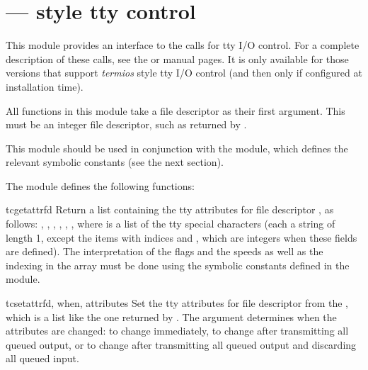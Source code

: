 \section{ ---
         \POSIX{} style tty control}




This module provides an interface to the \POSIX{} calls for tty I/O
control.  For a complete description of these calls, see the \POSIX{} or
\UNIX{} manual pages.  It is only available for those \UNIX{} versions
that support \POSIX{} \emph{termios} style tty I/O control (and then
only if configured at installation time).

All functions in this module take a file descriptor  as their
first argument.  This must be an integer file descriptor, such as
returned by .

This module should be used in conjunction with the
 module,
which defines the relevant symbolic constants (see the next section).

The module defines the following functions:

\begin{funcdesc}{tcgetattr}{fd}
Return a list containing the tty attributes for file descriptor
, as follows: \code{[}, , ,
, , , \code{]} where
 is a list of the tty special characters (each a string of
length 1, except the items with indices  and
, which are integers when these fields are
defined).  The interpretation of the flags and the speeds as well as
the indexing in the  array must be done using the symbolic
constants defined in the 
module.
\end{funcdesc}

\begin{funcdesc}{tcsetattr}{fd, when, attributes}
Set the tty attributes for file descriptor  from the
, which is a list like the one returned by
.  The  argument determines when the
attributes are changed:  to change
immediately,  to change after transmitting
all queued output, or  to change after
transmitting all queued output and discarding all queued input.
\end{funcdesc}

